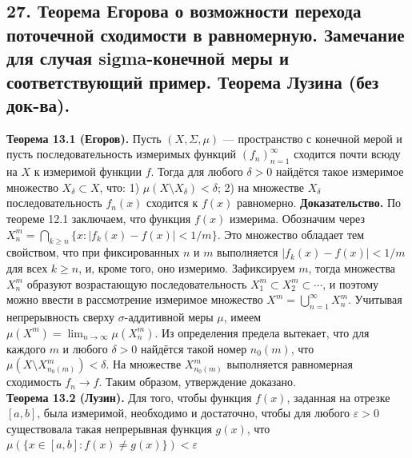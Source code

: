 \documentclass[12pt]{article}
\begin{document}
\subsection*{27. Теорема Егорова о возможности перехода поточечной сходимости в равномерную.
Замечание для случая sigma-конечной меры и соответствующий пример. Теорема Лузина
(без док-ва).}
\textbf{Теорема 13.1 (Егоров).} Пусть $(X,\Sigma,\mu)$ — пространство с конечной мерой и пусть последовательность измеримых функций $(f_n)_{n=1}^\infty$ сходится почти всюду на $X$ к измеримой функции $f$. Тогда для любого $\delta>0$ найдётся такое измеримое множество $X_\delta\subset X$, что: 1) $\mu(X\setminus X_\delta)<\delta$; 2) на множестве $X_\delta$ последовательность $f_n(x)$ сходится к $f(x)$ равномерно. \textbf{Доказательство.} По теореме 12.1 заключаем, что функция $f(x)$ измерима. Обозначим через $X^m_n=\bigcap_{k\geq n}\{x:|f_k(x)-f(x)|<1/m\}$. Это множество обладает тем свойством, что при фиксированных $n$ и $m$ выполняется $|f_k(x)-f(x)|<1/m$ для всех $k\geq n$, и, кроме того, оно измеримо. Зафиксируем $m$, тогда множества $X^m_n$ образуют возрастающую последовательность $X^m_1\subset X^m_2\subset\cdots$, и поэтому можно ввести в рассмотрение измеримое множество $X^m=\bigcup_{n=1}^\infty X^m_n$. Учитывая непрерывность сверху $\sigma$-аддитивной меры $\mu$, имеем $\mu(X^m)=\lim_{n\to\infty}\mu(X^m_n)$. Из определения предела вытекает, что для каждого $m$ и любого $\delta>0$ найдётся такой номер $n_0(m)$, что $\mu(X\setminus X^m_{n_0(m)})<\delta$. На множестве $X^m_{n_0(m)}$ выполняется равномерная сходимость $f_n\to f$. Таким образом, утверждение доказано. \\\textbf{Теорема 13.2 (Лузин).} Для того, чтобы функция $f(x)$, заданная на отрезке $[a,b]$, была измеримой, необходимо и достаточно, чтобы для любого $\varepsilon>0$ существовала такая непрерывная функция $g(x)$, что $\mu(\{x\in[a,b]:f(x)\neq g(x)\})<\varepsilon$

\end{document}

